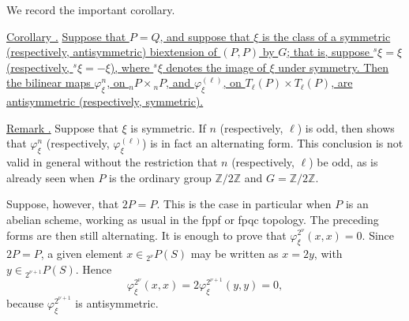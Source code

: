 We record the important corollary.

\medskip
\noindent\underline{Corollary .}
\underline{Suppose that $P=Q$, and suppose that $\xi$ is the class of
a symmetric (respectively, antisymmetric) biextension of $(P,P)$ by
$G$; that is, suppose ${}^s\xi=\xi$ (respectively,
${}^s\xi=-\xi$), where ${}^s\xi$ denotes the image of $\xi$ under
symmetry.  Then the bilinear maps $\varphi^n_\xi$, on
${}_nP\times{}_nP$, and $\varphi^{(\ell)}_\xi$, on
$T_\ell(P)\times T_\ell(P)$, are antisymmetric (respectively,
symmetric).}

\medskip
\noindent\underline{Remark .}
Suppose that $\xi$ is symmetric.  If $n$ (respectively, $\ell$) is
odd, then  shows that $\varphi^n_\xi$ (respectively,
$\varphi^{(\ell)}_\xi$) is in fact an alternating form.  This
conclusion is not valid in general without the restriction that $n$
(respectively, $\ell$) be odd, as is already seen when $P$ is the
ordinary group $\mathbb Z/2\mathbb Z$ and
$G=\mathbb Z/2\mathbb Z$.

Suppose, however, that $2P=P$.  This is the case in particular when
$P$ is an abelian scheme, working as usual in the fppf or fpqc
topology.  The preceding forms are then still alternating.  It is
enough to prove that $\varphi^{2^\nu}_\xi(x,x)=0$.  Since $2P=P$, a
given element $x\in{}_{2^\nu}P(S)$ may be written as $x=2y$, with
$y\in{}_{2^{\nu+1}}P(S)$.  Hence
\[
 \varphi^{2^\nu}_\xi(x,x)
 =2\varphi^{2^{\nu+1}}_\xi(y,y)=0,
\]
because $\varphi^{2^{\nu+1}}_\xi$ is antisymmetric.
